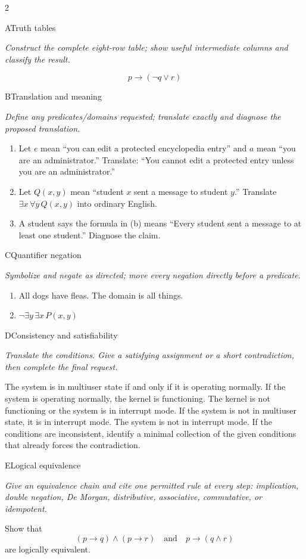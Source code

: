 \documentclass[9pt]{extarticle}
\begin{document}
\begin{multicols}{2}
\begin{CoreProblem}{A}{Truth tables}
{\scriptsize\textit{Construct the complete eight-row table; show useful intermediate columns and classify the result.}\par}
\[
  p\to(\neg q\lor r)
\]
\end{CoreProblem}
\begin{CoreProblem}{B}{Translation and meaning}
{\scriptsize\textit{Define any predicates/domains requested; translate exactly and diagnose the proposed translation.}\par}
\begin{enumerate}[label=(\alph*)]
  \item Let $e$ mean ``you can edit a protected encyclopedia entry'' and $a$
        mean ``you are an administrator.'' Translate: ``You cannot edit a
        protected entry unless you are an administrator.''
  \item Let $Q(x,y)$ mean ``student $x$ sent a message to student $y$.''
        Translate $\exists x\,\forall y\,Q(x,y)$ into ordinary English.
  \item A student says the formula in (b) means ``Every student sent a message
        to at least one student.'' Diagnose the claim.
\end{enumerate}
\end{CoreProblem}
\begin{CoreProblem}{C}{Quantifier negation}
{\scriptsize\textit{Symbolize and negate as directed; move every negation directly before a predicate.}\par}
\begin{enumerate}[label=(\alph*)]
  \item All dogs have fleas. The domain is all things.
  \item $\neg\exists y\,\exists x\,P(x,y)$
\end{enumerate}
\end{CoreProblem}
\columnbreak
\begin{CoreProblem}{D}{Consistency and satisfiability}
{\scriptsize\textit{Translate the conditions. Give a satisfying assignment or a short contradiction, then complete the final request.}\par}
The system is in multiuser state if and only if it is operating normally. If
the system is operating normally, the kernel is functioning. The kernel is not
functioning or the system is in interrupt mode. If the system is not in
multiuser state, it is in interrupt mode. The system is not in interrupt mode.
If the conditions are inconsistent, identify a minimal collection of the given
conditions that already forces the contradiction.
\end{CoreProblem}
\begin{CoreProblem}{E}{Logical equivalence}
{\scriptsize\textit{Give an equivalence chain and cite one permitted rule at every step: implication, double negation, De Morgan, distributive, associative, commutative, or idempotent.}\par}
Show that
\[
  (p\to q)\land(p\to r)
  \quad\text{and}\quad
  p\to(q\land r)
\]
are logically equivalent.
\end{CoreProblem}
\end{multicols}
\end{document}
